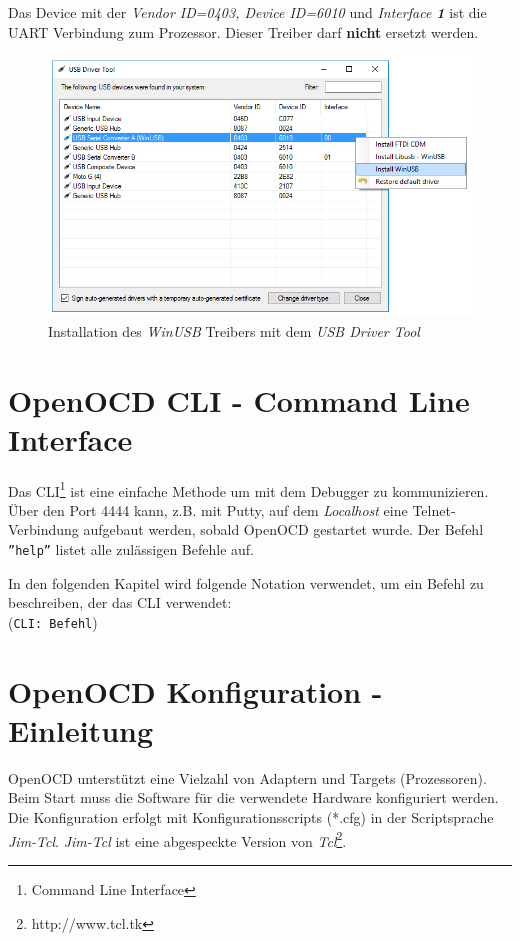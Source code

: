 Das Device mit der \textit{Vendor ID=0403, Device ID=6010} und \textit{Interface \textbf{1}} ist die UART Verbindung zum Prozessor.
Dieser Treiber darf \textbf{nicht} ersetzt werden.

\begin{figure}[htbp]
	\centering
		\includegraphics[width=12cm,keepaspectratio]{images/InstallWinUSBDriver.png}
	\caption{Installation des \textit{WinUSB} Treibers mit dem \textit{USB Driver Tool}}
	\label{fig:InstallWinUSBDriver}
\end{figure}


\section{OpenOCD CLI - Command Line Interface}
Das CLI\footnote{Command Line Interface} ist eine einfache Methode um mit dem Debugger zu kommunizieren.
Über den Port 4444 kann, z.B. mit Putty, auf dem \textit{Localhost} eine Telnet-Verbindung aufgebaut werden, sobald OpenOCD gestartet wurde.
Der Befehl \texttt{''help''} listet alle zulässigen Befehle auf.

In den folgenden Kapitel wird folgende Notation verwendet, um ein Befehl zu beschreiben, der das CLI verwendet:\\
(\texttt{CLI: Befehl})


\section{OpenOCD Konfiguration - Einleitung}
OpenOCD unterstützt eine Vielzahl von Adaptern und Targets (Prozessoren).
Beim Start muss die Software für die verwendete Hardware konfiguriert werden.
Die Konfiguration erfolgt mit Konfigurationsscripts (*.cfg) in der Scriptsprache \textit{Jim-Tcl}.
\textit{Jim-Tcl} ist eine abgespeckte Version von \textit{Tcl}\footnote{http://www.tcl.tk}.

